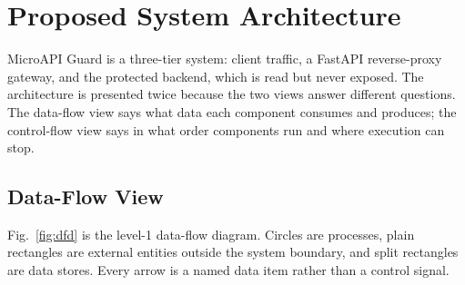 \documentclass[conference]{IEEEtran}
\begin{document}
\section{Proposed System Architecture}
\label{sec:arch}
MicroAPI Guard is a three-tier system: client traffic, a FastAPI reverse-proxy gateway, and
the protected backend, which is read but never exposed. The architecture is presented twice
because the two views answer different questions. The data-flow view says what data each
component consumes and produces; the control-flow view says in what order components run and
where execution can stop.

\subsection{Data-Flow View}
\label{sec:dfd}
Fig.~\ref{fig:dfd} is the level-1 data-flow diagram. Circles are processes, plain rectangles
are external entities outside the system boundary, and split rectangles are data stores. Every
arrow is a named data item rather than a control signal.
\end{document}
